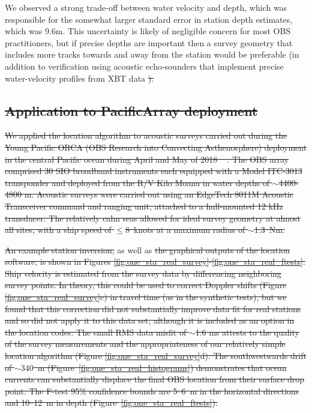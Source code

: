 \documentclass[10pt,titlepage]{article}
\providecommand{\DIFaddtex}[1]{{\protect\color{blue}\uwave{#1}}} %
\providecommand{\DIFdeltex}[1]{{\protect\color{red}\sout{#1}}}                      %
\providecommand{\DIFaddbegin}{} %
\providecommand{\DIFaddend}{} %
\providecommand{\DIFdelbegin}{} %
\providecommand{\DIFdelend}{} %
\providecommand{\DIFadd}[1]{\texorpdfstring{\DIFaddtex{#1}}{#1}} %
\providecommand{\DIFdel}[1]{\texorpdfstring{\DIFdeltex{#1}}{}} %
\begin{document}
We observed a strong trade-off between water velocity and depth, which was responsible for the somewhat larger standard error in station depth estimates, which was \mbox{9.6\DIFaddbegin \DIFadd{~}\DIFaddend m}. This uncertainty is likely of negligible concern for most OBS practitioners, but if precise depths are important then a survey geometry that includes more tracks towards and away from the station would be preferable (in addition to verification using acoustic echo-sounders that implement precise water-velocity profiles from XBT data \DIFdelbegin \DIFdel{).
}%

\subsection{\DIFdel{Application to PacificArray deployment}}
\addtocounter{subsection}{-1}%
\DIFdel{We applied the location algorithm to acoustic surveys carried out during the Young Pacific ORCA (OBS Research into Convecting Asthenosphere) deployment in the central Pacific ocean during April and May of 2018 \mbox{%
\citep{Gaherty2018}}%
. The OBS array comprised 30 SIO broadband instruments each equipped with a Model ITC-3013 transponder and deployed from the R/V Kilo Moana in water depths of $\sim$4400-4800 m. Acoustic  surveys were carried out using an EdgeTech 8011M Acoustic Transceiver command and ranging unit, attached to a hull-mounted 12 kHz transducer. The relatively calm seas allowed for ideal survey geometry at almost all sites, with a ship speed of \mbox{$\le$8 knots} at a maximum radius of \mbox{$\sim$1.3 Nm}. 
}%

\DIFdel{An example station inversion, }\DIFdelend as well as \DIFdelbegin \DIFdel{the graphical outputs of the location software, is shown in Figures \ref{fig:one_sta_real_survey}-\ref{fig:one_sta_real_ftests}. Ship velocity is estimated from the survey data by differencing neighboring survey points. In theory, this could be used to correct Doppler shifts (Figure \ref{fig:one_sta_real_survey}c) in travel time (as in the synthetic tests), but we found that this correction did not substantially improve data fit for real stations and so did not apply it to this data set, although it is included as an option in the location codes. The small RMS data misfit of $\sim$1.6 ms attests to the quality of the survey measurements and the appropriateness of our relatively simple location algorithm (Figure \ref{fig:one_sta_real_survey}d). The southwestwards drift of \mbox{$\sim340$ m} (Figure~\ref{fig:one_sta_real_histograms}) demonstrates that ocean currents can substantially displace the final OBS location from their surface drop point. The F-test 95\% confidence bounds are 5--6~m in the horizontal directions and 10--12~m in depth (Figure~\ref{fig:one_sta_real_ftests}).
}\DIFdelend \DIFaddbegin \DIFadd{an accurate GPS-transponder offset correction).
}\DIFaddend 
\end{document}
